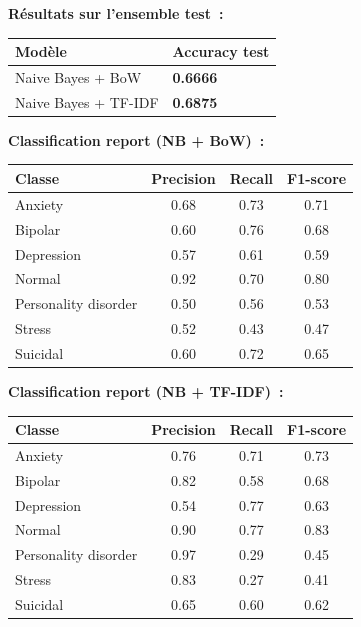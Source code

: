 \documentclass[12pt,a4paper]{report}
\begin{document}
\textbf{Résultats sur l'ensemble test~:}

\begin{center}
\begin{tabular}{ll}
\toprule
\textbf{Modèle} & \textbf{Accuracy test} \\
\midrule
Naive Bayes + BoW    & \textbf{0.6666} \\
Naive Bayes + TF-IDF & \textbf{0.6875} \\
\bottomrule
\end{tabular}
\end{center}

\textbf{Classification report (NB + BoW)~:}

\begin{center}
\begin{tabular}{lccc}
\toprule
\textbf{Classe} & \textbf{Precision} & \textbf{Recall} & \textbf{F1-score} \\
\midrule
Anxiety              & 0.68 & 0.73 & 0.71 \\
Bipolar              & 0.60 & 0.76 & 0.68 \\
Depression           & 0.57 & 0.61 & 0.59 \\
Normal               & 0.92 & 0.70 & 0.80 \\
Personality disorder & 0.50 & 0.56 & 0.53 \\
Stress               & 0.52 & 0.43 & 0.47 \\
Suicidal             & 0.60 & 0.72 & 0.65 \\
\bottomrule
\end{tabular}
\end{center}

\textbf{Classification report (NB + TF-IDF)~:}

\begin{center}
\begin{tabular}{lccc}
\toprule
\textbf{Classe} & \textbf{Precision} & \textbf{Recall} & \textbf{F1-score} \\
\midrule
Anxiety              & 0.76 & 0.71 & 0.73 \\
Bipolar              & 0.82 & 0.58 & 0.68 \\
Depression           & 0.54 & 0.77 & 0.63 \\
Normal               & 0.90 & 0.77 & 0.83 \\
Personality disorder & 0.97 & 0.29 & 0.45 \\
Stress               & 0.83 & 0.27 & 0.41 \\
Suicidal             & 0.65 & 0.60 & 0.62 \\
\bottomrule
\end{tabular}
\end{center}
\end{document}
